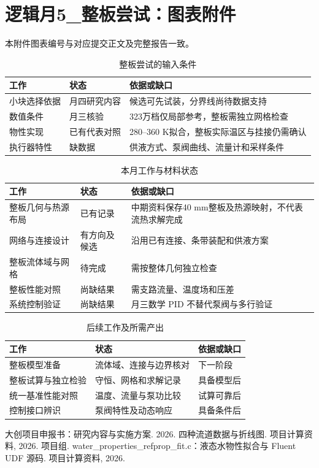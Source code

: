 \documentclass[stage2,fontset=fandol]{ydzjreport}
\begin{document}
\section*{逻辑月5\_整板尝试：图表附件}
本附件图表编号与对应提交正文及完整报告一致。\par\clearpage
\setcounter{table}{0}
\begin{table}[H]\centering
\caption{整板尝试的输入条件}\label{tab:pre}
\begin{tabularx}{\textwidth}{@{}Y Y Y@{}}
\toprule
{} 工作 & 状态 & 依据或缺口 \\
\midrule
小块选择依据 & 月四研究内容 & 候选可先试装，分界线尚待数据支持 \\
数值条件 & 月三核验 & 323万档仅局部参考，整板需独立网格检查 \\
物性实现 & 已有代表对照 & 280--360 K拟合，整板实际温区与挂接仍需确认 \\
执行器特性 & 缺数据 & 供液方式、泵阀曲线、流量计和采样条件 \\
\bottomrule\end{tabularx}\end{table}
\clearpage
\setcounter{table}{1}
\begin{table}[H]\centering
\caption{本月工作与材料状态}\label{tab:tasks}
\begin{tabularx}{\textwidth}{@{}Y Y Y@{}}
\toprule
{} 工作 & 状态 & 依据或缺口 \\
\midrule
整板几何与热源布局 & 已有记录 & 中期资料保存40 mm整板及热源映射，不代表流热求解完成 \\
网络与连接设计 & 有方向及候选 & 沿用已有连接、条带装配和供液方案 \\
整板流体域与网格 & 待完成 & 需按整体几何独立检查 \\
整板性能对照 & 尚缺结果 & 需支路流量、温度场和压差 \\
系统控制验证 & 尚缺结果 & 月三数学 PID 不替代泵阀与多行验证 \\
\bottomrule\end{tabularx}\end{table}
\clearpage
\setcounter{table}{2}
\begin{table}[H]\centering
\caption{后续工作及所需产出}\label{tab:plan}
\begin{tabularx}{\textwidth}{@{}Y Y Y@{}}
\toprule
{} 工作 & 状态 & 依据或缺口 \\
\midrule
整板模型准备 & 流体域、连接与边界核对 & 下一阶段 \\
整板试算与独立检验 & 守恒、网格和求解记录 & 具备模型后 \\
统一基准性能对照 & 温度、流量与泵功比较 & 试算可靠后 \\
控制接口辨识 & 泵阀特性及动态响应 & 具备条件后 \\
\bottomrule\end{tabularx}\end{table}
\clearpage
\begin{thebibliography}{9}
 大创项目申报书：研究内容与实施方案. 2026.
 四种流道数据与折线图. 项目计算资料, 2026.
 项目组. water\_properties\_refprop\_fit.c：液态水物性拟合与 Fluent UDF 源码. 项目计算资料, 2026.
\end{thebibliography}
\end{document}
